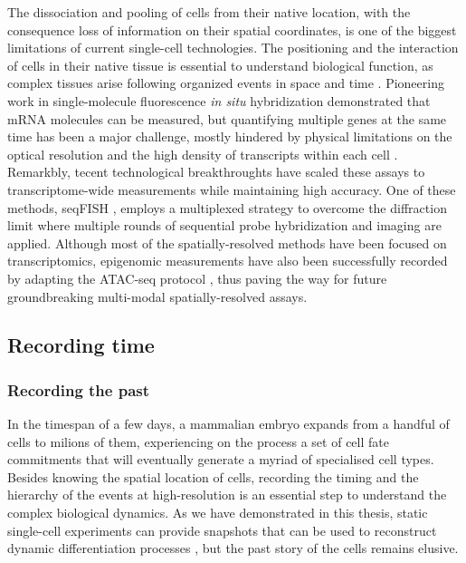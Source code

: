 The dissociation and pooling of cells from their native location, with the consequence loss of information on their spatial coordinates, is one of the biggest limitations of current single-cell technologies. The positioning and the interaction of cells in their native tissue is essential to understand biological function, as complex tissues arise following organized events in space and time \cite{Mayr2019}. Pioneering work in single-molecule fluorescence \textit{in situ} hybridization demonstrated that mRNA molecules can be measured, but quantifying multiple genes at the same time has been a major challenge, mostly hindered by physical limitations on the optical resolution and the high density of transcripts within each cell \cite{Eng2019}. Remarkbly, tecent technological breakthroughts have scaled these assays to transcriptome-wide measurements while maintaining high accuracy. One of these methods, seqFISH \cite{Lubeck2014,Eng2019}, employs a multiplexed strategy to overcome the diffraction limit where multiple rounds of sequential probe hybridization and imaging are applied. Although most of the spatially-resolved methods have been focused on transcriptomics, epigenomic measurements have also been successfully recorded by adapting the ATAC-seq protocol \cite{Thornton2019}, thus paving the way for future groundbreaking multi-modal spatially-resolved assays.

\subsection{Recording time} 

\subsubsection{Recording the past} 

In the timespan of a few days, a mammalian embryo expands from a handful of cells to milions of them, experiencing on the process a set of cell fate commitments that will eventually generate a myriad of specialised cell types. Besides knowing the spatial location of cells, recording the timing and the hierarchy of the events at high-resolution is an essential step to understand the complex biological dynamics.  As we have demonstrated in this thesis, static single-cell experiments can provide snapshots that can be used to reconstruct dynamic differentiation processes \cite{Weinreb2018}, but the past story of the cells remains elusive.

